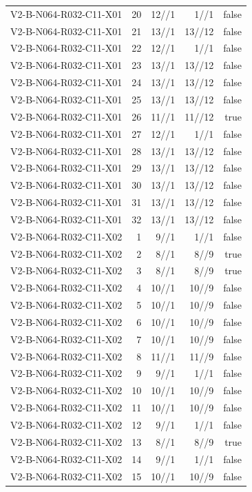 {\begin{longtable}{lrrrr}
V2-B-N064-R032-C11-X01 & 20 & 12//1 & 1//1 & false \\
V2-B-N064-R032-C11-X01 & 21 & 13//1 & 13//12 & false \\
V2-B-N064-R032-C11-X01 & 22 & 12//1 & 1//1 & false \\
V2-B-N064-R032-C11-X01 & 23 & 13//1 & 13//12 & false \\
V2-B-N064-R032-C11-X01 & 24 & 13//1 & 13//12 & false \\
V2-B-N064-R032-C11-X01 & 25 & 13//1 & 13//12 & false \\
V2-B-N064-R032-C11-X01 & 26 & 11//1 & 11//12 & true \\
V2-B-N064-R032-C11-X01 & 27 & 12//1 & 1//1 & false \\
V2-B-N064-R032-C11-X01 & 28 & 13//1 & 13//12 & false \\
V2-B-N064-R032-C11-X01 & 29 & 13//1 & 13//12 & false \\
V2-B-N064-R032-C11-X01 & 30 & 13//1 & 13//12 & false \\
V2-B-N064-R032-C11-X01 & 31 & 13//1 & 13//12 & false \\
V2-B-N064-R032-C11-X01 & 32 & 13//1 & 13//12 & false \\
V2-B-N064-R032-C11-X02 & 1 & 9//1 & 1//1 & false \\
V2-B-N064-R032-C11-X02 & 2 & 8//1 & 8//9 & true \\
V2-B-N064-R032-C11-X02 & 3 & 8//1 & 8//9 & true \\
V2-B-N064-R032-C11-X02 & 4 & 10//1 & 10//9 & false \\
V2-B-N064-R032-C11-X02 & 5 & 10//1 & 10//9 & false \\
V2-B-N064-R032-C11-X02 & 6 & 10//1 & 10//9 & false \\
V2-B-N064-R032-C11-X02 & 7 & 10//1 & 10//9 & false \\
V2-B-N064-R032-C11-X02 & 8 & 11//1 & 11//9 & false \\
V2-B-N064-R032-C11-X02 & 9 & 9//1 & 1//1 & false \\
V2-B-N064-R032-C11-X02 & 10 & 10//1 & 10//9 & false \\
V2-B-N064-R032-C11-X02 & 11 & 10//1 & 10//9 & false \\
V2-B-N064-R032-C11-X02 & 12 & 9//1 & 1//1 & false \\
V2-B-N064-R032-C11-X02 & 13 & 8//1 & 8//9 & true \\
V2-B-N064-R032-C11-X02 & 14 & 9//1 & 1//1 & false \\
V2-B-N064-R032-C11-X02 & 15 & 10//1 & 10//9 & false \\

\end{longtable}}
